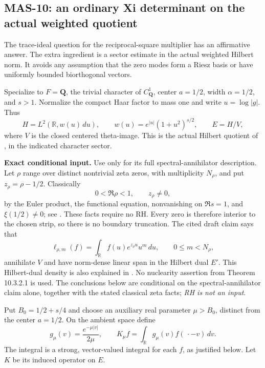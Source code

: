 \documentclass[11pt,a4paper]{article}
\newcommand{\R}{\mathbb R}
\begin{document}
\subsection{MAS-10: an ordinary Xi determinant on the actual weighted quotient}
The trace-ideal question for the reciprocal-square multiplier has an affirmative answer. The extra ingredient is a sector estimate in the actual weighted Hilbert norm. It avoids any assumption that the zero modes form a Riesz basis or have uniformly bounded biorthogonal vectors.

Specialize to $F=\mathbf Q$, the trivial character of $C_{\mathbf Q}^1$, center $a=1/2$, width $\alpha=1/2$, and $s>1$. Normalize the compact Haar factor to mass one and write $u=\log|g|$. Thus
\[
 H=L^2(\R,w(u)\,du),\qquad
 w(u)=e^{|u|}(1+u^2)^{s/2},\qquad E=H/V,
\]
where $V$ is the closed centered theta-image. This is the actual Hilbert quotient of \cite[(10.2.2.1)--(10.2.2.2), p.~445]{masullo}, in the indicated character sector.

\textbf{Exact conditional input.} Use \cite[Theorem 10.2.2.1, (10.2.2.4)--(10.2.2.6), p.~446]{masullo} only for its full spectral-annihilator description. Let $\rho$ range over distinct nontrivial zeta zeros, with multiplicity $N_\rho$, and put $z_\rho=\rho-1/2$. Classically
\[
 0<\Re\rho<1,\qquad z_\rho\ne0,
\]
by the Euler product, the functional equation, nonvanishing on $\Re s=1$, and $\xi(1/2)\ne0$; see \cite[\S2.12; \S3.2, pp.~46--47]{titch}. These facts require no RH. Every zero is therefore interior to the chosen strip, so there is no boundary truncation. The cited draft claim says that
\[
 \ell_{\rho,m}(f)=\int_{\R}f(u)e^{z_\rho u}u^m\,du,
 \qquad 0\le m<N_\rho,
\]
annihilate $V$ and have norm-dense linear span in the Hilbert dual $E'$. This Hilbert-dual density is also explained in \cite[Remark 10.2.1.2, pp.~440--441]{masullo}. No nuclearity assertion from Theorem 10.3.2.1 is used. The conclusions below are conditional on the spectral-annihilator claim alone, together with the stated classical zeta facts; \emph{RH is not an input}.

Put $B_0=1/2+s/4$ and choose an auxiliary real parameter $\mu>B_0$, distinct from the center $a=1/2$. On the ambient space define
\[
 g_\mu(v)=\frac{e^{-\mu|v|}}{2\mu},\qquad
 K_\mu f=\int_{\R}g_\mu(v)f(\,\cdot-v)\,dv.
\]
The integral is a strong, vector-valued integral for each $f$, as justified below. Let $K$ be its induced operator on $E$.
\end{document}
